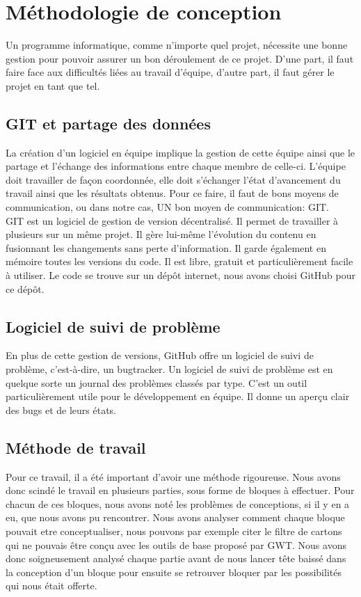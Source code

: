 \chapter{Méthodologie de conception}
Un programme informatique, comme n'importe quel projet, nécessite une bonne gestion pour pouvoir assurer un bon déroulement de ce projet.
D'une part, il faut faire face aux difficultés liées au travail d'équipe, d'autre part, il faut gérer le projet en tant que tel.

  \section{GIT et partage des données}
  La création d'un logiciel en équipe implique la gestion de cette équipe ainsi que le partage et l'échange des
  informations entre chaque membre de celle-ci.
  L'équipe doit travailler de façon coordonnée, elle doit s'échanger l'état
  d'avancement du travail ainsi que les résultats obtenus. Pour ce faire, il faut
  de bons moyens de communication, ou dans notre cas, UN bon moyen de communication: GIT\cite{git}. \\

  GIT est un logiciel de gestion de version décentralisé. Il permet de
  travailler à plusieurs sur un même projet. Il gère lui-même l'évolution du
  contenu en fusionnant les changements sans perte d'information. Il garde
  également en mémoire toutes les versions du code. Il est libre, gratuit et
  particulièrement facile à utiliser. Le code se trouve sur un dépôt internet, nous avons choisi GitHub\cite{github} pour ce dépôt.\\

  \section{Logiciel de suivi de problème}
  En plus de cette gestion de versions, GitHub offre un logiciel de suivi de problème, c'est-à-dire, un bugtracker.
  Un logiciel de suivi de problème est en quelque sorte un journal des problèmes classés par type.
  C'est un outil particulièrement utile pour le développement en équipe. Il donne un aperçu clair des bugs et de leurs états.

  \section{Méthode de travail}
Pour ce travail, il a été important d'avoir une méthode rigoureuse. Nous avons donc scindé le travail en plusieurs parties, sous forme de bloques à effectuer. Pour chacun de ces bloques, nous avons noté les problèmes de conceptions, si il y en a eu, que nous avons pu rencontrer. Nous avons analyser comment chaque bloque pouvait etre conceptualiser, nous pouvons par exemple citer le filtre de cartons qui ne pouvais être conçu avec les outils de base proposé par GWT. Nous avons donc soigneusement analysé chaque partie avant de nous lancer tête baissé dans la conception d'un bloque pour ensuite se retrouver bloquer par les possibilités qui nous était offerte.

